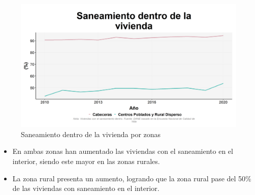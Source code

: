     \begin{figure}[H]
        \caption{Saneamiento dentro de la vivienda por zonas \label{map_result_2} }
        \begin{center}
        \includegraphics[width=\textwidth,keepaspectratio]{img/var_194_trend.png}
        \end{center}
    \end{figure}
            \begin{itemize}
                    \item En ambas zonas han aumentado las viviendas con el saneamiento en el interior, siendo este mayor en las zonas rurales.
                    \item La zona rural presenta un aumento, logrando que la zona rural pase del 50\% de las viviendas con saneamiento en el interior.
                    \end{itemize}

